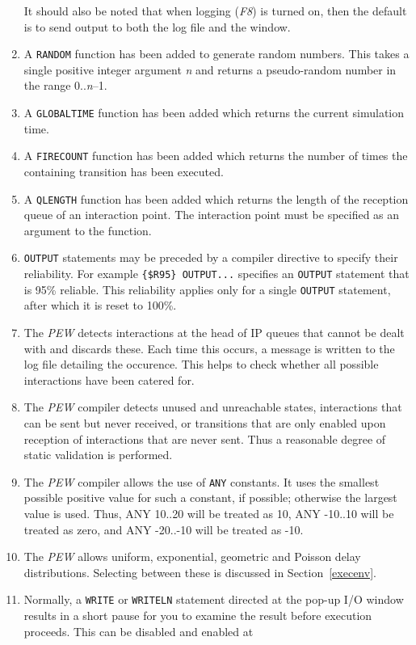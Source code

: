 \begin{enumerate}
It should also be noted that when logging ({\em F8}) is turned on,
then the default is to send output to both the log file and the
window.
\item  A {\tt RANDOM} function has been added to generate random numbers.
This takes a single positive integer argument {\em n} and returns a
pseudo-random number in the range 0..{\em n}--1.
\item A {\tt GLOBALTIME} function has been added which returns the
current simulation time.
\item A {\tt FIRECOUNT} function has been added which returns the
number of times the containing transition has been executed.
\item A {\tt QLENGTH} function has been added which returns the
length of the reception queue of an interaction point. The
interaction point must be specified as an argument to the function.
\item {\tt OUTPUT} statements may be preceded by a compiler directive to 
specify	their reliability. For example {\tt \{\$R95\} OUTPUT...} specifies an
{\tt OUTPUT} statement that is 95\% reliable. This reliability applies
only for a single {\tt OUTPUT} statement, after which it is reset to
100\%.
\item The {\em PEW} detects interactions at the head of IP queues
that cannot be dealt with and discards these. Each time this occurs,
a message is written to the log file detailing the occurence. This
helps to check whether all possible interactions have been catered
for.
\item The {\em PEW} compiler detects unused and unreachable states,
interactions that can be sent but never received, or transitions that
are only enabled upon reception of interactions that are never sent.
Thus a reasonable degree of static validation is performed.
\item The {\em PEW} compiler allows the use of {\tt ANY} constants.
It uses the smallest possible positive value for such a constant, if
possible; otherwise the largest value is used.
Thus, ANY 10..20 will be treated as 10, ANY -10..10 will be treated
as zero, and ANY -20..-10 will be treated as -10. 
\item The {\em PEW} allows uniform, exponential, geometric and Poisson delay
distributions. Selecting between these is discussed in
Section~\ref{execenv}.
\item Normally, a {\tt WRITE} or {\tt WRITELN} statement directed at
the pop-up I/O window results in a short pause for you to examine the
result before execution proceeds. This can be disabled and enabled at

\end{enumerate}
